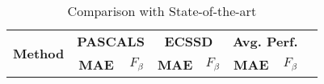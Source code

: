 \documentclass[a4paper,conference]{IEEEtran}
\begin{document}
\begin{table}
  \caption{Comparison with State-of-the-art}
  \centering
  \renewcommand{\arraystretch}{1.2}
  \begin{tabular}{|p{1cm}|c|c|c|c|c|c|c|}
    \hline
    \multirow{2}{2cm}{\textbf{Method}} & \multicolumn{2}{c|}{\textbf{PASCALS}} & \multicolumn{2}{c|}{\textbf{ECSSD}} & \multicolumn{2}{c|}{\textbf{Avg. Perf.}}   \\
    \cline{2-7}
    & \textbf{MAE} & \textbf{$F_\beta$} & \textbf{MAE} & \textbf{$F_\beta$} & \textbf{MAE} & \textbf{$F_\beta$}  \\
    \hline


\end{tabular}
\end{table}
\end{document}
